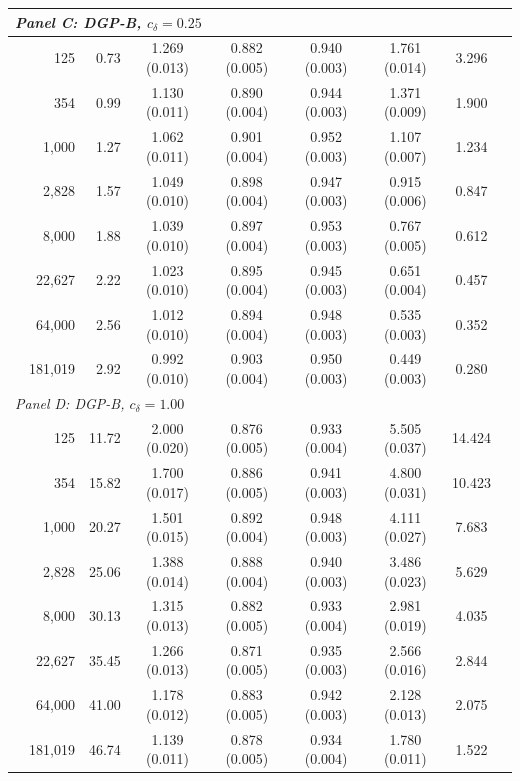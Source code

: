 \begin{tabular}{lrrcccccc}
\multicolumn{8}{l}{\textit{Panel C: DGP-B, $c_\delta=0.25$}} \\
\midrule
& 125 & 0.73 & 1.269 (0.013) & 0.882 (0.005) & 0.940 (0.003) & 1.761 (0.014) & 3.296 \\
& 354 & 0.99 & 1.130 (0.011) & 0.890 (0.004) & 0.944 (0.003) & 1.371 (0.009) & 1.900 \\
& 1,000 & 1.27 & 1.062 (0.011) & 0.901 (0.004) & 0.952 (0.003) & 1.107 (0.007) & 1.234 \\
& 2,828 & 1.57 & 1.049 (0.010) & 0.898 (0.004) & 0.947 (0.003) & 0.915 (0.006) & 0.847 \\
& 8,000 & 1.88 & 1.039 (0.010) & 0.897 (0.004) & 0.953 (0.003) & 0.767 (0.005) & 0.612 \\
& 22,627 & 2.22 & 1.023 (0.010) & 0.895 (0.004) & 0.945 (0.003) & 0.651 (0.004) & 0.457 \\
& 64,000 & 2.56 & 1.012 (0.010) & 0.894 (0.004) & 0.948 (0.003) & 0.535 (0.003) & 0.352 \\
& 181,019 & 2.92 & 0.992 (0.010) & 0.903 (0.004) & 0.950 (0.003) & 0.449 (0.003) & 0.280 \\
\multicolumn{8}{l}{\textit{Panel D: DGP-B, $c_\delta=1.00$}} \\
\midrule
& 125 & 11.72 & 2.000 (0.020) & 0.876 (0.005) & 0.933 (0.004) & 5.505 (0.037) & 14.424 \\
& 354 & 15.82 & 1.700 (0.017) & 0.886 (0.005) & 0.941 (0.003) & 4.800 (0.031) & 10.423 \\
& 1,000 & 20.27 & 1.501 (0.015) & 0.892 (0.004) & 0.948 (0.003) & 4.111 (0.027) & 7.683 \\
& 2,828 & 25.06 & 1.388 (0.014) & 0.888 (0.004) & 0.940 (0.003) & 3.486 (0.023) & 5.629 \\
& 8,000 & 30.13 & 1.315 (0.013) & 0.882 (0.005) & 0.933 (0.004) & 2.981 (0.019) & 4.035 \\
& 22,627 & 35.45 & 1.266 (0.013) & 0.871 (0.005) & 0.935 (0.003) & 2.566 (0.016) & 2.844 \\
& 64,000 & 41.00 & 1.178 (0.012) & 0.883 (0.005) & 0.942 (0.003) & 2.128 (0.013) & 2.075 \\
& 181,019 & 46.74 & 1.139 (0.011) & 0.878 (0.005) & 0.934 (0.004) & 1.780 (0.011) & 1.522 \\
\bottomrule
\end{tabular}
